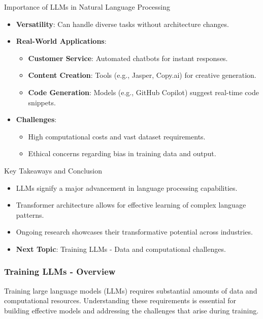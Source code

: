 \documentclass[aspectratio=169]{beamer}
\begin{document}
\begin{frame}[fragile]{Importance of LLMs in Natural Language Processing}

\begin{itemize}
    \item \textbf{Versatility}: Can handle diverse tasks without architecture changes.
    \item \textbf{Real-World Applications}:
    \begin{itemize}
        \item \textbf{Customer Service}: Automated chatbots for instant responses.
        \item \textbf{Content Creation}: Tools (e.g., Jasper, Copy.ai) for creative generation.
        \item \textbf{Code Generation}: Models (e.g., GitHub Copilot) suggest real-time code snippets.
    \end{itemize}
    \item \textbf{Challenges}:
    \begin{itemize}
        \item High computational costs and vast dataset requirements.
        \item Ethical concerns regarding bias in training data and output.
    \end{itemize}
\end{itemize}

\end{frame}

\begin{frame}[fragile]{Key Takeaways and Conclusion}

\begin{itemize}
    \item LLMs signify a major advancement in language processing capabilities.
    \item Transformer architecture allows for effective learning of complex language patterns.
    \item Ongoing research showcases their transformative potential across industries.
    \item \textbf{Next Topic}: Training LLMs - Data and computational challenges.
\end{itemize}

\end{frame}

\begin{frame}[fragile]
    \frametitle{Training LLMs - Overview}
    Training large language models (LLMs) requires substantial amounts of data and computational resources. Understanding these requirements is essential for building effective models and addressing the challenges that arise during training.
\end{frame}
\end{document}
